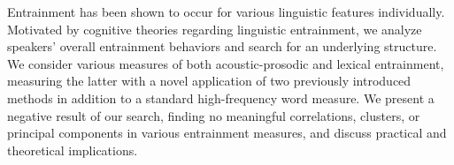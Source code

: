 Entrainment has been shown to occur for various linguistic features individually. Motivated by cognitive theories regarding linguistic entrainment, we analyze speakers' overall entrainment behaviors and search for an underlying structure. We consider various measures of both acoustic-prosodic and lexical entrainment, measuring the latter with a novel application of two previously introduced methods in addition to a standard high-frequency word measure. We present a negative result of our search, finding no meaningful correlations, clusters, or principal components in various entrainment measures, and discuss practical and theoretical implications.
